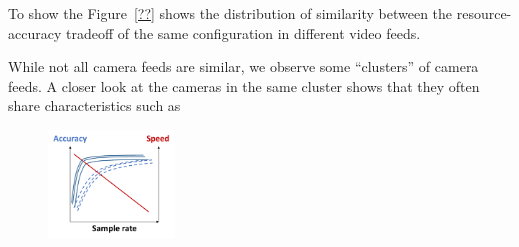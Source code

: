 To show the Figure~\ref{??} shows the distribution of similarity 
between the resource-accuracy tradeoff of the same configuration 
in different video feeds.

While not all camera feeds are similar, we observe some ``clusters''
of camera feeds. 
A closer look at the cameras in the same cluster shows that they 
often share characteristics such as

\begin{figure}[h!]
\centering
\includegraphics[width=0.3\textwidth]{figures/SpatialCorrelation.pdf}
\vspace{-0.2cm}
\label{fig:SpatialCorrelation}
\end{figure}
